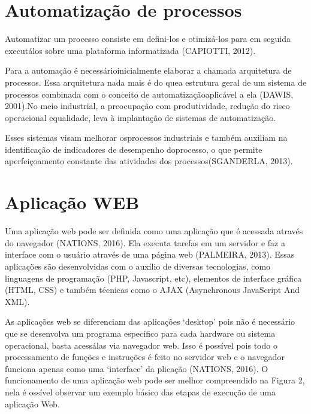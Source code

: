 \vspace{-42pt}
\section[Automatização de processos]{Automatização de processos}
Automatizar um processo consiste em defini-los e otimizá-los para em seguida executálos sobre uma plataforma informatizada (CAPIOTTI, 2012). 

Para a automação é necessárioinicialmente elaborar a chamada arquitetura de processos. Essa arquitetura nada mais é do quea estrutura geral de um sistema de processos combinada com o conceito de automatizaçãoaplicável a ela (DAWIS, 2001).No meio industrial, a preocupação com produtividade, redução do risco operacional equalidade, leva à implantação de sistemas de automatização. 

Esses sistemas visam melhorar osprocessos industriais e também auxiliam na identificação de indicadores de desempenho doprocesso, o que permite aperfeiçoamento constante das atividades dos processos(SGANDERLA, 2013).

\section[Aplicação WEB]{Aplicação WEB}
Uma aplicação web pode ser definida como uma aplicação que é acessada através do navegador (NATIONS, 2016). Ela executa tarefas em um servidor e faz a interface com o usuário através de uma página web (PALMEIRA, 2013). Essas aplicações são desenvolvidas com o auxílio de diversas tecnologias, como linguagens de programação (PHP, Javascript, etc), elementos de interface gráfica (HTML, CSS) e também técnicas como o AJAX (Asynchronous JavaScript And XML).

As aplicações web se diferenciam das aplicações ‘desktop’ pois não é necessário que se desenvolva um programa específico para cada hardware ou sistema operacional, basta acessálas via navegador web. Isso é possível pois todo o processamento de funções e instruções é feito no servidor web e o navegador funciona apenas como uma ‘interface’ da  plicação (NATIONS, 2016). O funcionamento de uma aplicação web pode ser melhor compreendido na Figura 2, nela é ossível observar um exemplo básico das etapas de execução de uma aplicação Web.